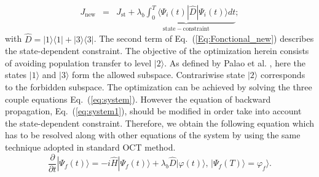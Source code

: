 \documentclass[]{interact}
\theoremstyle{plain}%
\theoremstyle{definition}
\theoremstyle{remark}
\begin{document}
\begin{eqnarray} 
  J_{\mathrm{new}} & = & J_{\mathrm{st}} +\underbrace{\lambda_b\int_0^T 
\langle\varPsi_i(t)|\hat{D}|\varPsi_i(t)\rangle
dt}_{\mathrm{state-constraint}};
\label{Eq:Fonctional_new}
\end{eqnarray}
with $\hat{D} =|1\rangle\langle 1| + |3\rangle\langle 3|$. The second term of 
Eq.~(\ref{Eq:Fonctional_new}) describes the state-dependent constraint. 
The objective of the optimization herein consists of avoiding population 
transfer to level $|2\rangle$. 
As defined by Palao et al. \cite{Koch}, here the states $|1\rangle$ and 
$|3\rangle$ form  the allowed subspace. Contrariwise state $|2\rangle$  
corresponds to the forbidden subspace.
The optimization can be achieved by solving the 
three couple equations Eq.~(\ref{eq:system}). However the equation of backward 
propagation, Eq.~(\ref{eq:system1}), should be modified in order take into 
account the state-dependent constraint. Therefore, we obtain the following 
equation which has to be resolved along with other equations of the system by 
using the same technique adopted in standard OCT method. 
 \begin{equation}
   \frac{\partial}{\partial t} |\varPsi_f(t)\rangle 
   = -i \hat{H}|\varPsi_f(t)\rangle
   +\lambda_b \hat{D}|\varphi(t)\rangle,  
    \, |\varPsi_f(T)\rangle =  \varphi_f\rangle.
    \label{Eq:EDP-new}
 \end{equation}
\end{document}
